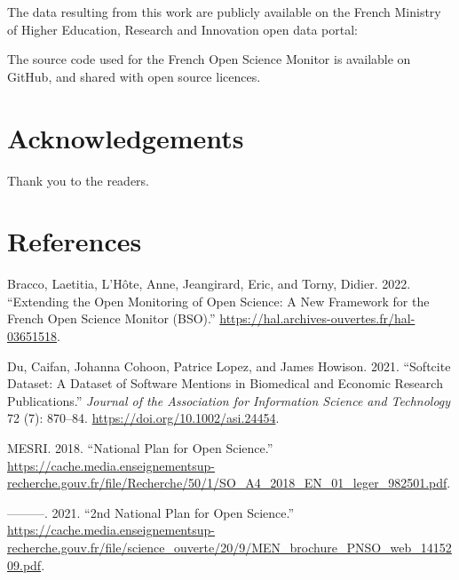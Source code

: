 \documentclass[
]{article}
\newlength{\cslhangindent}
\newenvironment{cslreferences}%
  {\setlength{\parindent}{0pt}%
  \everypar{\setlength{\hangindent}{\cslhangindent}}\ignorespaces}%
  {\par}
\begin{document}
The data resulting from this work are publicly available on the French
Ministry of Higher Education, Research and Innovation open data portal:

The source code used for the French Open Science Monitor is available on
GitHub, and shared with open source licences.

\hypertarget{acknowledgements}{%
\section{Acknowledgements}\label{acknowledgements}}

Thank you to the readers.

\hypertarget{references}{%
\section*{References}\label{references}}

\hypertarget{refs}{}
\begin{cslreferences}
\leavevmode\hypertarget{ref-bracco_extending_2022}{}%
Bracco, Laetitia, L'Hôte, Anne, Jeangirard, Eric, and Torny, Didier.
2022. ``Extending the Open Monitoring of Open Science: A New Framework
for the French Open Science Monitor (BSO).''
\url{https://hal.archives-ouvertes.fr/hal-03651518}.

\leavevmode\hypertarget{ref-du_softcite_2021}{}%
Du, Caifan, Johanna Cohoon, Patrice Lopez, and James Howison. 2021.
``Softcite Dataset: A Dataset of Software Mentions in Biomedical and
Economic Research Publications.'' \emph{Journal of the Association for
Information Science and Technology} 72 (7): 870--84.
\url{https://doi.org/10.1002/asi.24454}.

\leavevmode\hypertarget{ref-mesri_national_2018}{}%
MESRI. 2018. ``National Plan for Open Science.''
\url{https://cache.media.enseignementsup-recherche.gouv.fr/file/Recherche/50/1/SO_A4_2018_EN_01_leger_982501.pdf}.

\leavevmode\hypertarget{ref-mesri_2nd_2021}{}%
---------. 2021. ``2nd National Plan for Open Science.''
\url{https://cache.media.enseignementsup-recherche.gouv.fr/file/science_ouverte/20/9/MEN_brochure_PNSO_web_1415209.pdf}.
\end{cslreferences}
\end{document}
